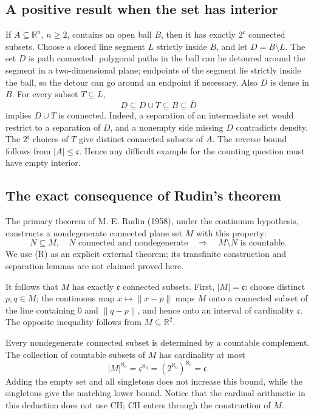 \subsection*{A positive result when the set has interior}
If \(A\subseteq\mathbb R^n\), \(n\geq2\), contains an open ball \(B\), then it has exactly \(2^{\mathfrak c}\) connected subsets.
Choose a closed line segment \(L\) strictly inside \(B\), and let \(D=B\setminus L\).
The set \(D\) is path connected: polygonal paths in the ball can be detoured around the segment in a two-dimensional plane; endpoints of the segment lie strictly inside the ball, so the detour can go around an endpoint if necessary.
Also \(D\) is dense in \(B\).
For every subset \(T\subseteq L\),
\[
 D\subseteq D\cup T\subseteq B\subseteq\overline D
\]
implies \(D\cup T\) is connected.
Indeed, a separation of an intermediate set would restrict to a separation of \(D\), and a nonempty side missing \(D\) contradicts density.
The \(2^{\mathfrak c}\) choices of \(T\) give distinct connected subsets of \(A\).
The reverse bound follows from \(|A|\leq\mathfrak c\).
Hence any difficult example for the counting question must have empty interior.

\subsection*{The exact consequence of Rudin's theorem}
The primary theorem of M. E. Rudin (1958), under the continuum hypothesis, constructs a nondegenerate connected plane set \(M\) with this property:
\[
 N\subseteq M,\quad N\text{ connected and nondegenerate}
 \quad\Longrightarrow\quad M\setminus N\text{ is countable}. \tag{R}
\]
We use (R) as an explicit external theorem; its transfinite construction and separation lemmas are not claimed proved here.

It follows that \(M\) has exactly \(\mathfrak c\) connected subsets.
First, \(|M|=\mathfrak c\): choose distinct \(p,q\in M\); the continuous map
\(x\mapsto\|x-p\|\) maps \(M\) onto a connected subset of the line containing \(0\) and \(\|q-p\|\), and hence onto an interval of cardinality \(\mathfrak c\).
The opposite inequality follows from \(M\subseteq\mathbb R^2\).

Every nondegenerate connected subset is determined by a countable complement. The collection of countable subsets of \(M\) has cardinality at most
\[
 |M|^{\aleph_0}
 =\mathfrak c^{\aleph_0}
 =(2^{\aleph_0})^{\aleph_0}
 =\mathfrak c.
\]
Adding the empty set and all singletons does not increase this bound, while the singletons give the matching lower bound.
Notice that the cardinal arithmetic in this deduction does not use CH; CH enters through the construction of \(M\).

